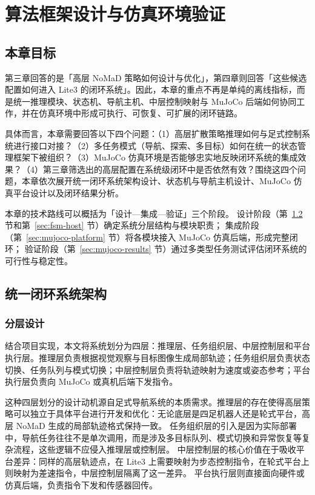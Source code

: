 
\chapter{算法框架设计与仿真环境验证}

\section{本章目标}

第三章回答的是「高层 NoMaD 策略如何设计与优化」，第四章则回答「这些候选配置如何进入 Lite3 的闭环系统」。因此，本章的重点不再是单纯的离线指标，而是统一推理模块、状态机、导航主机、中层控制映射与 MuJoCo 后端如何协同工作，并在仿真环境中形成可执行、可恢复、可扩展的闭环链路。

具体而言，本章需要回答以下四个问题：（1）高层扩散策略推理如何与足式控制系统进行接口对接？（2）多任务模式（导航、探索、多目标）如何在统一的状态管理框架下被组织？（3）MuJoCo 仿真环境是否能够忠实地反映闭环系统的集成效果？（4）第三章筛选出的高层配置在系统级闭环中是否依然有效？围绕这四个问题，本章依次展开统一闭环系统架构设计、状态机与导航主机设计、MuJoCo 仿真平台设计以及闭环结果分析。

本章的技术路线可以概括为「设计—集成—验证」三个阶段。
设计阶段（第~\ref{sec:unified-arch} 节和第~\ref{sec:fsm-host} 节）确定系统分层结构与模块职责；
集成阶段（第~\ref{sec:mujoco-platform} 节）将各模块接入 MuJoCo 仿真后端，形成完整闭环；
验证阶段（第~\ref{sec:mujoco-results} 节）通过多类型任务测试评估闭环系统的可行性与稳定性。

\section{统一闭环系统架构}\label{sec:unified-arch}

\subsection{分层设计}

结合项目实现，本文将系统划分为四层：推理层、任务组织层、中层控制层和平台执行层。推理层负责根据视觉观察与目标图像生成局部轨迹；任务组织层负责状态切换、任务队列与模式切换；中层控制层负责将轨迹映射为速度或姿态参考；平台执行层负责向 MuJoCo 或真机后端下发指令。

这种四层划分的设计动机源自足式导航系统的本质需求。推理层的存在使得高层策略可以独立于具体平台进行开发和优化：无论底层是四足机器人还是轮式平台，高层 NoMaD 生成的局部轨迹格式保持一致。
任务组织层的引入是因为实际部署中，导航任务往往不是单次调用，而是涉及多目标队列、模式切换和异常恢复等复杂流程，这些逻辑不应侵入推理层或控制层。
中层控制层的核心价值在于吸收平台差异：同样的高层轨迹点，在 Lite3 上需要映射为步态控制指令，在轮式平台上则映射为差速指令，中层控制层隔离了这一差异。
平台执行层则直接面向硬件或仿真后端，负责指令下发和传感器回传。

